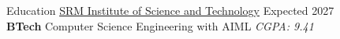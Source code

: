 \documentclass{resume} %
\begin{document}














\begin{rSection}{Education}
    \href{https://www.linkedin.com/school/s.r.m.-institute-of-science-&-technology-chennai/}{SRM Institute of Science and Technology} \hfill Expected 2027\\
\textbf{BTech} Computer Science Engineering with AIML \hfill \textit{CGPA: 9.41}
\end{rSection}
\end{document}
